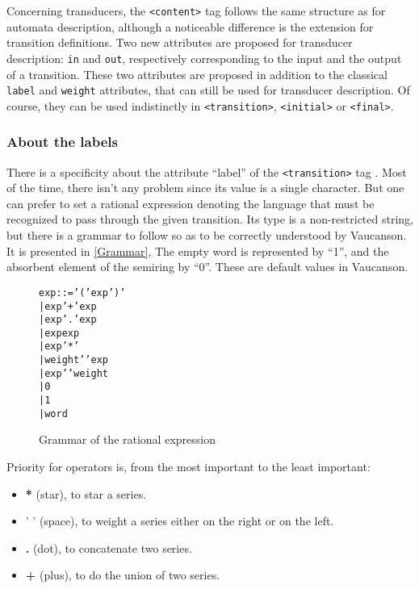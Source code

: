 \documentclass[a4paper]{article}
\newcommand{\Vauc}{{\sc Vaucanson}\xspace}
\def\contenttag{\texttt{<content>}}
\def\transitiontag{\texttt{<transition>}}
\def\finaltag{\texttt{<final>}}
\def\initialtag{\texttt{<initial>}}
\begin{document}
Concerning transducers, the \contenttag{} tag follows the same structure as
for automata description, although a noticeable difference is the extension for
transition definitions. Two new attributes are proposed for transducer
description: \verb|in| and \verb|out|, respectively corresponding to
the input and the output of a transition. These two attributes are
proposed in addition to the classical \verb|label| and \verb|weight|
attributes, that can still be used for transducer description. Of course, they
can be used indistinctly in \transitiontag{}, \initialtag{} or \finaltag{}.

\subsubsection{About the labels}

There is a specificity about the attribute ``label'' of the \transitiontag{}
tag . Most of the time, there isn't any problem since its value is a single
character. But one can prefer to set a rational expression denoting the
language that must be recognized to pass through the given transition. Its
type is a non-restricted string, but there is a grammar to follow so as to be correctly
understood by \Vauc. It is presented in \autoref{Grammar}, The empty word
is represented by ``1'', and the absorbent element of the semiring by ``0''.
These are default values in \Vauc.

{\small

\begin{figure}[h]
  \begin{center}
\begin{alltt}
     exp ::= '(' exp ')'
         |   exp '+' exp
         |   exp '.' exp
         |   exp exp
         |   exp '*'
         |   weight ' ' exp
         |   exp ' ' weight
         |   0
         |   1
         |   word
\end{alltt}

\caption{Grammar of the rational expression}
\label{Grammar}
  \end{center}
\end{figure}
}

Priority for operators is, from the most important to the least
important:
\begin{itemize}
\item \textbf{*} (star), to star a series.
\item ' ' (space), to weight a series either on the right or on the left.
\item \textbf{.} (dot), to concatenate two series.
\item \textbf{+} (plus), to do the union of two series.
\end{itemize}
\end{document}
